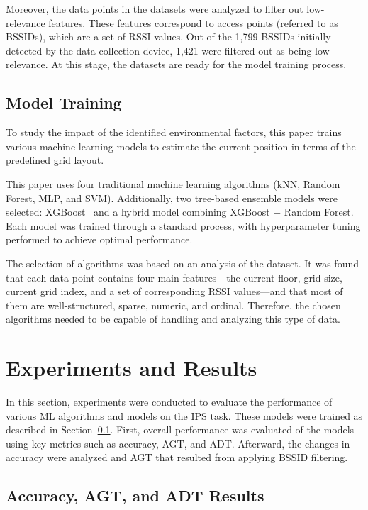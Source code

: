 \documentclass[runningheads]{llncs}
\begin{document}
Moreover, the data points in the datasets were analyzed to filter out low-relevance features. These features correspond to access points (referred to as BSSIDs), which are a set of RSSI values. Out of the 1,799 BSSIDs initially detected by the data collection device, 1,421 were filtered out as being low-relevance. At this stage, the datasets are ready for the model training process.

\subsection{Model Training}\label{ssec:training}

To study the impact of the identified environmental factors, this paper trains various machine learning models to estimate the current position in terms of the predefined grid layout.

This paper uses four traditional machine learning algorithms (kNN, Random Forest, MLP, and SVM). Additionally, two tree-based ensemble models were selected: XGBoost~\cite{add2} and a hybrid model combining XGBoost + Random Forest. Each model was trained through a standard process, with hyperparameter tuning performed to achieve optimal performance.

The selection of algorithms was based on an analysis of the dataset. It was found that each data point contains four main features—the current floor, grid size, current grid index, and a set of corresponding RSSI values—and that most of them are well-structured, sparse, numeric, and ordinal. Therefore, the chosen algorithms needed to be capable of handling and analyzing this type of data.


\section{Experiments and Results}\label{sec:experiment-results}

In this section, experiments were conducted to evaluate the performance of various ML algorithms and models on the IPS task. These models were trained as described in Section~\ref{ssec:training}. First, overall performance was evaluated of the models using key metrics such as accuracy, AGT, and ADT. Afterward, the changes in accuracy were analyzed and AGT that resulted from applying BSSID filtering.

\subsection{Accuracy, AGT, and ADT Results}\label{ssec:acc-agt-adt-results}
\end{document}
